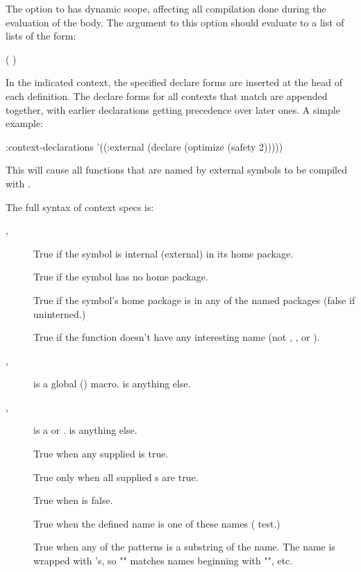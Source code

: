 The  option to  has
dynamic scope, affecting all compilation done during the evaluation of the
body.  The argument to this option should evaluate to a list of lists of the
form:
\begin{example}
( )
\end{example}
In the indicated context, the specified declare forms are inserted at
the head of each definition.  The declare forms for all contexts that
match are appended together, with earlier declarations getting
precedence over later ones.  A simple example:
\begin{example}
    :context-declarations
    '((:external (declare (optimize (safety 2)))))
\end{example}
This will cause all functions that are named by external symbols to be
compiled with .

The full syntax of context specs is:
\begin{description}

\item[, ]
True if the symbol is internal (external) in its home package.

\item[]
True if the symbol has no home package.

\item[]
True if the symbol's home package is in any of the named packages (false if
uninterned.)

\item[]
True if the function doesn't have any interesting name (not
, ,  or ).

\item[, ]
 is a global () macro.   is anything
else.

\item[, ]
 is a  or .   is anything else.

\item[]
True when any supplied  is true.

\item[]
True only when all supplied s are true.

\item[]
True when  is false.

\item[]
True when the defined name is one of these names ( test.)

\item[]
True when any of the patterns is a substring of the name.  The name is wrapped
with \code{$}'s, so "" matches names beginning with "", etc.
\end{description}

